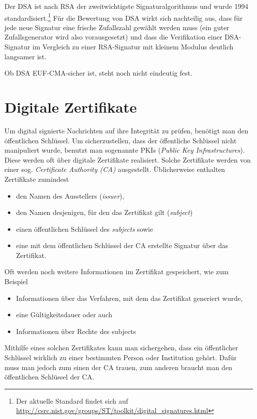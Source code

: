 Der DSA ist nach RSA der zweitwichtigste Signaturalgorithmus und wurde
1994 standardisiert.\footnote{Der aktuelle Standard findet sich auf
  \url{http://csrc.nist.gov/groups/ST/toolkit/digital_signatures.html}}
Für die Bewertung von DSA wirkt sich nachteilig aus, dass für jede neue
Signatur eine frische Zufallszahl gewählt werden muss (ein guter
Zufallsgenerator wird also vorausgesetzt) und dass die Verifikation
einer DSA-Signatur im Vergleich zu einer RSA-Signatur mit kleinem
Modulus deutlich langsamer ist.

Ob DSA EUF-CMA-sicher ist, steht noch nicht eindeutig fest.

\section{Digitale Zertifikate}
\indexDigitalCert Um digital signierte Nachrichten auf ihre Integrität
zu prüfen, benötigt man den öffentlichen Schlüssel. Um sicherzustellen,
dass der öffentliche Schlüssel nicht manipuliert wurde, benutzt man
sogenannte PKIs (\emph{Public Key Infrastructures}). Diese werden oft
über digitale Zertifikate realisiert. Solche Zertifikate werden von
einer sog. \emph{Certificate Authority (CA)} \indexCertAuthority
ausgestellt. Üblicherweise enthalten Zertifikate zumindest
\begin{itemize}
\item den Namen des Ausstellers (\emph{issuer}),
\item den Namen desjenigen, für den das Zertifikat gilt (\emph{subject})
\item einen öffentlichen Schlüssel des \emph{subjects} sowie
\item eine mit dem öffentlichen Schlüssel der CA erstellte Signatur über
  das Zertifikat.
\end{itemize} Oft werden noch weitere Informationen im Zertifikat
gespeichert, wie zum Beispiel
\begin{itemize}
\item Informationen über das Verfahren, mit dem das Zertifikat generiert
  wurde,
\item eine Gültigkeitsdauer oder auch
\item Informationen über Rechte des subjects
\end{itemize}

Mithilfe eines solchen Zertifikates kann man sichergehen, dass ein
öffentlicher Schlüssel wirklich zu einer bestimmten Person oder
Institution gehört. Dafür muss man jedoch zum einen der CA
\indexCertAuthority trauen, zum anderen braucht man den öffentlichen
Schlüssel der CA.

